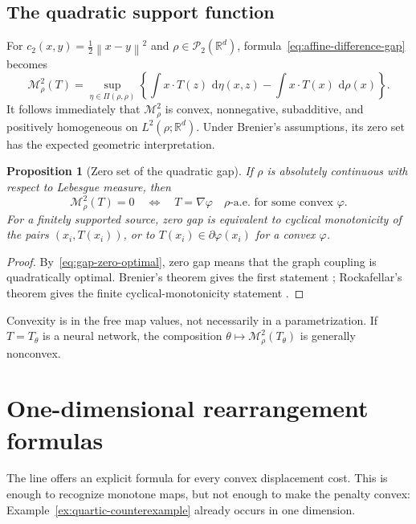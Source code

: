 \documentclass[11pt,a4paper]{article}
\newtheorem{proposition}[theorem]{Proposition}
\theoremstyle{definition}
\theoremstyle{remark}
\newcommand{\R}{\mathbb R}
\newcommand{\Pcal}{\mathcal P}
\newcommand{\Mcal}{\mathcal M}
\newcommand{\dd}{\,\mathrm d}
\newcommand{\norm}[1]{\left\lVert #1\right\rVert}
\begin{document}
\subsection{The quadratic support function}

For $c_2(x,y)=\tfrac12\norm{x-y}^2$ and
$\rho\in\Pcal_2(\R^d)$, formula~\eqref{eq:affine-difference-gap} becomes
\begin{equation}\label{eq:quadratic-support-form}
  \Mcal_\rho^2(T)
  =\sup_{\eta\in\Pi(\rho,\rho)}
  \left\{
    \int x\mathbin{\cdot}T(z)\,\dd\eta(x,z)
    -\int x\mathbin{\cdot}T(x)\,\dd\rho(x)
  \right\}.
\end{equation}
It follows immediately that $\Mcal_\rho^2$ is convex, nonnegative,
subadditive, and positively homogeneous on $L^2(\rho;\R^d)$. Under Brenier's
assumptions, its zero set has the expected geometric interpretation.

\begin{proposition}[Zero set of the quadratic gap]\label{prop:quadratic-zero-set}
If $\rho$ is absolutely continuous with respect to Lebesgue measure, then
\[
  \Mcal_\rho^2(T)=0
  \quad\Longleftrightarrow\quad
  T=\nabla\varphi\quad\rho\text{-a.e. for some convex }\varphi.
\]
For a finitely supported source, zero gap is equivalent to cyclical
monotonicity of the pairs $(x_i,T(x_i))$, or to
$T(x_i)\in\partial\varphi(x_i)$ for a convex $\varphi$.
\end{proposition}

\begin{proof}
By~\eqref{eq:gap-zero-optimal}, zero gap means that the graph coupling is
quadratically optimal. Brenier's theorem gives the first statement
\citep{Brenier1991,Villani2009}; Rockafellar's theorem gives the finite
cyclical-monotonicity statement \citep{Rockafellar1966}.
\end{proof}

Convexity is in the free map values, not necessarily in a parametrization. If
$T=T_\theta$ is a neural network, the composition
$\theta\mapsto\Mcal_\rho^2(T_\theta)$ is generally nonconvex.

\section{One-dimensional rearrangement formulas}

The line offers an explicit formula for every convex displacement cost. This
is enough to recognize monotone maps, but not enough to make the penalty
convex: Example~\ref{ex:quartic-counterexample} already occurs in one
dimension.
\end{document}
